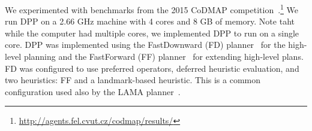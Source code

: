 \documentclass[letterpaper]{article}
\theoremstyle{definition}
\begin{document}
We experimented with benchmarks from the 2015 CoDMAP competition~\cite{vstolba2015competition}.\footnote{\url{http://agents.fel.cvut.cz/codmap/results/}} 
We run DPP on a 2.66 GHz machine with 4 cores and 8 GB of memory. Note taht while the computer had multiple cores, we implemented DPP to run on a single core. DPP was 
implemented using the FastDownward (FD) planner~\cite{helmert2006fast} for the high-level planning and the FastForward (FF) planner~\cite{hoffmann2001ff} for extending high-level plans. FD was configured to use preferred operators, deferred heuristic evaluation, and two heuristics: FF and a landmark-based heuristic. This is a common configuration used also by the LAMA planner~\cite{richter2010lama}. 




\end{document}
